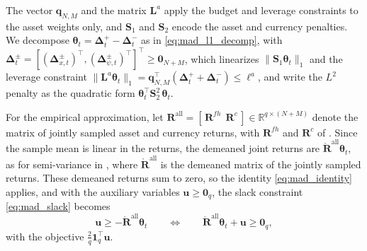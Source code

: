 The vector $\bm{q}_{N,M}$ and the matrix $\bm{L}^a$ apply the budget and leverage constraints to the asset weights
only, and $\bm{S}_1$ and $\bm{S}_2$ encode the asset and currency penalties. We decompose
$\bm{\theta}_t = \bm{\Delta}_t^+ - \bm{\Delta}_t^-$ as in \eqref{eq:mad_l1_decomp}, with
$\bm{\Delta}_t^\pm = [(\bm{\Delta}_{x,t}^\pm)^\top, (\bm{\Delta}_{\psi,t}^\pm)^\top]^\top \ge \bm{0}_{N+M}$, which
linearizes $\|\bm{S}_1 \bm{\theta}_t\|_1$ and the leverage constraint
$\|\bm{L}^a \bm{\theta}_t\|_1 = \bm{q}_{N,M}^\top (\bm{\Delta}_t^+ + \bm{\Delta}_t^-) \le \ell^a$, and write the $L^2$
penalty as the quadratic form $\bm{\theta}_t^\top \bm{S}_2^2\, \bm{\theta}_t$.

For the empirical approximation, let $\bm{R}^{\text{all}} = [\, \bm{R}^{fh}\ \ \bm{R}^c \,] \in
\mathbb{R}^{q \times (N+M)}$ denote the matrix of jointly sampled asset and currency returns, with $\bm{R}^{fh}$ and
$\bm{R}^c$ of . Since the sample mean is linear in the returns, the demeaned joint returns are
$\mathring{\bm{R}}^{\text{all}} \bm{\theta}_t$, as for semi-variance in , where
$\mathring{\bm{R}}^{\text{all}}$ is the demeaned matrix of the jointly sampled returns. These demeaned returns sum to
zero, so the identity \eqref{eq:mad_identity} applies, and with the auxiliary variables $\bm{u} \ge \bm{0}_q$,
the slack constraint \eqref{eq:mad_slack} becomes
\begin{equation*}
    \bm{u} \ge -\mathring{\bm{R}}^{\text{all}} \bm{\theta}_t
    \qquad \Longleftrightarrow \qquad
    \mathring{\bm{R}}^{\text{all}} \bm{\theta}_t + \bm{u} \ge \bm{0}_q,
\end{equation*}
with the objective $\frac{2}{q} \bm{1}_q^\top \bm{u}$.

